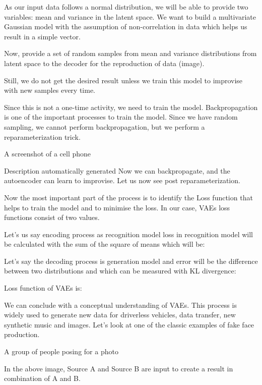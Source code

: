 As our input data follows a normal distribution, we will be able to provide two variables: mean and variance in the latent space. We want to build a multivariate Gaussian model with the assumption of non-correlation in data which helps us result in a simple vector.

Now, provide a set of random samples from mean and variance distributions from latent space to the decoder for the reproduction of data (image).

Still, we do not get the desired result unless we train this model to improvise with new samples every time.

Since this is not a one-time activity, we need to train the model. Backpropagation is one of the important processes to train the model. Since we have random sampling, we cannot perform backpropagation, but we perform a reparameterization trick. 



A screenshot of a cell phone

Description automatically generated
Now we can backpropagate, and the autoencoder can learn to improvise. Let us now see post reparameterization.


Now the most important part of the process is to identify the Loss function that helps to train the model and to minimise the loss. In our case, VAEs loss functions consist of two values.

Let’s us say encoding process as recognition model loss in recognition model will be calculated with the sum of the square of means which will be:


Let’s say the decoding process is generation model and error will be the difference between two distributions and which can be measured with KL divergence: 


Loss function of VAEs is:


We can conclude with a conceptual understanding of VAEs. This process is widely used to generate new data for driverless vehicles, data transfer, new synthetic music and images.  Let’s look at one of the classic examples of fake face production. 

A group of people posing for a photo

In the above image, Source A and Source B are input to create a result in combination of A and B. 

